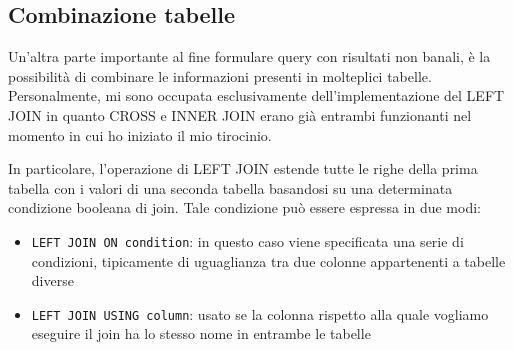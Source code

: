 \subsection{Combinazione tabelle}
Un'altra parte importante al fine formulare query con risultati non banali, è la possibilità di combinare le informazioni presenti in molteplici tabelle. Personalmente, mi sono occupata
esclusivamente dell'implementazione del LEFT JOIN in quanto CROSS e INNER JOIN erano già entrambi funzionanti nel momento in cui ho iniziato il mio tirocinio.

In particolare, l'operazione di LEFT JOIN estende tutte le righe della prima tabella con i valori di una seconda tabella basandosi su una determinata condizione booleana di join. Tale condizione
può essere espressa in due modi:
\begin{itemize}
    \item \verb+LEFT JOIN ON condition+: in questo caso viene specificata una serie di condizioni, tipicamente di uguaglianza tra due colonne appartenenti a tabelle diverse
    \item \verb+LEFT JOIN USING column+: usato se la colonna rispetto alla quale vogliamo eseguire il join ha lo stesso nome in entrambe le tabelle
\end{itemize}


